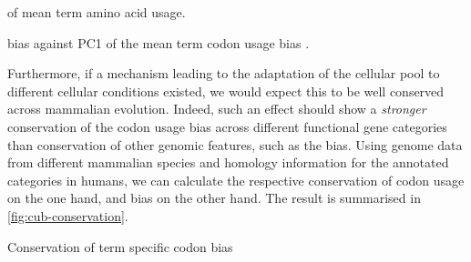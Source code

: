     {\pca of mean \go term amino acid usage.}
    {}

    {\gc bias against PC1 of the mean \go term codon usage bias \pca.}
    {}

Furthermore, if a mechanism leading to the adaptation of the cellular \trna pool
to different cellular conditions existed, we would expect this to be well
conserved across mammalian evolution. Indeed, such an effect should show a
\emph{stronger} conservation of the codon usage bias across different functional
gene categories than conservation of other genomic features, such as the \gc
bias. Using genome data from different mammalian species and homology
information for the annotated \go categories in humans, we can calculate the
respective conservation of codon usage on the one hand, and \gc bias on the
other hand. The result is summarised in \cref{fig:cub-conservation}.

    {Conservation of \go term specific codon bias}
    {}
